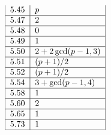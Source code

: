 \documentclass[10pt]{article}
\begin{document}
{\[\begin{tabular}{|l|l|}
5.45 & $p$ \\ \hline
5.47 & $2$ \\ \hline
5.48 & $0$ \\ \hline
5.49 & $1$ \\ \hline
5.50 & $2+2\gcd (p-1,3)$ \\ \hline
5.51 & $(p+1)/2$ \\ \hline
5.52 & $(p+1)/2$ \\ \hline
5.54 & $3+\gcd (p-1,4)$ \\ \hline
5.58 & $1$ \\ \hline
5.60 & $2$ \\ \hline
5.65 & $1$ \\ \hline
5.73 & $1$ \\ \hline
\end{tabular}%
\ 
\]%
}
\end{document}

